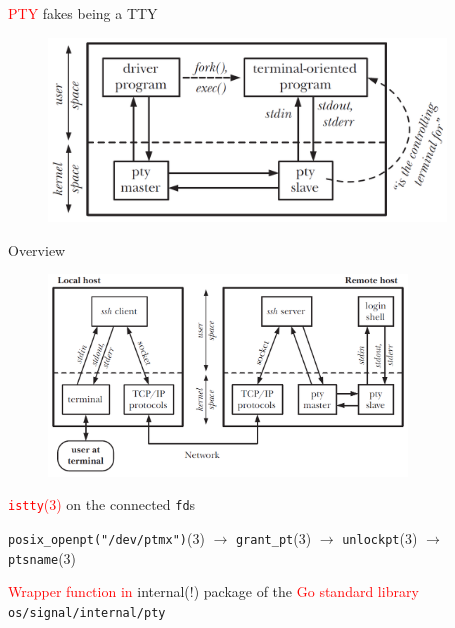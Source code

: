 \documentclass[
	xcolor=dvipsnames,
	handout
]{beamer}
\newenvironment{zhawframe}[1][]
{\begin{frame}[environment=fr,#1]{\insertsubsectionhead}{\insertsectionhead}}
{\end{frame}
}
\begin{document}
\begin{zhawframe}
\textcolor{red}{PTY} fakes being a TTY
\begin{figure}[ht]
\includegraphics[width=0.94\textwidth]{Pseudoterminal}
\end{figure}
\end{zhawframe}

\begin{zhawframe}
Overview
\begin{figure}[ht]
\includegraphics[width=0.85\textwidth]{PseudoterminalSSH}
\end{figure}
\end{zhawframe}

\begin{zhawframe}
 \textcolor{red}{\texttt{istty}(3)} on the connected \texttt{fd}s

 \texttt{posix\_{}openpt("/dev/ptmx")}(3) $\rightarrow$ \texttt{grant\_{}pt}(3) $\rightarrow$ \texttt{unlockpt}(3) $\rightarrow$ \texttt{ptsname}(3)

 \textcolor{red}{Wrapper function in} internal(!) package of the \textcolor{red}{Go standard library} \texttt{os/signal/internal/pty}
\end{zhawframe}
\end{document}

